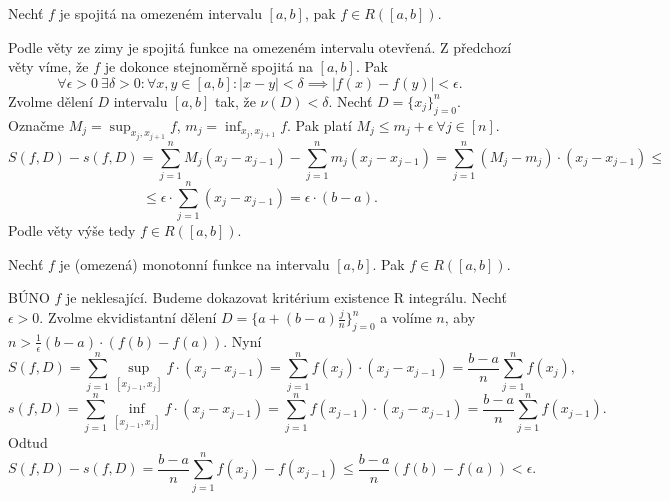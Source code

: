 \documentclass[12pt]{article}                   %
\begin{document}
        \begin{veta}
            Nechť $f$ je spojitá na omezeném intervalu $[a, b]$, pak $f \in R([a, b])$.

            \begin{dukazin}
                Podle věty ze zimy je spojitá funkce na omezeném intervalu otevřená. Z předchozí věty víme, že $f$ je dokonce stejnoměrně spojitá na $[a, b]$. Pak
                $$ \forall \epsilon > 0\ \exists \delta > 0: \forall x, y \in [a, b]: |x - y| < \delta \implies |f(x) - f(y)| < \epsilon. $$
                Zvolme dělení $D$ intervalu $[a, b]$ tak, že $\nu(D) < \delta$. Nechť $D = \{x_j\}_{j = 0}^n$. Označme $M_j = \sup_{x_j, x_{j + 1}}f$, $m_j = \inf_{x_j, x_{j + 1}}f$. Pak platí $M_j ≤ m_j + \epsilon\ \forall j \in [n]$.
                $$ S(f, D) - s(f, D) = \sum_{j=1}^n M_j(x_j - x_{j-1}) - \sum_{j=1}^n m_j(x_j - x_{j-1}) = \sum_{j=1}^n (M_j - m_j)·(x_j - x_{j-1}) ≤ $$
                $$ ≤ \epsilon·\sum_{j=1}^n (x_j - x_{j-1}) = \epsilon·(b - a). $$
                Podle věty výše tedy $f \in R([a, b])$.
            \end{dukazin}
        \end{veta}

        \begin{veta}
            Nechť $f$ je (omezená) monotonní funkce na intervalu $[a, b]$. Pak $f \in R([a, b])$.

            \begin{dukazin}
                BÚNO $f$ je neklesající. Budeme dokazovat kritérium existence R integrálu. Nechť $\epsilon > 0$. Zvolme ekvidistantní dělení $D = \{a + (b - a)\frac{j}{n}\}_{j=0}^n$ a volíme $n$, aby $n > \frac{1}{\epsilon}(b-a)·(f(b) - f(a))$. Nyní
                $$ S(f, D) = \sum_{j = 1}^n \sup_{[x_{j-1}, x_j]}f·(x_j - x_{j-1}) = \sum_{j=1}^n f(x_j)·(x_j - x_{j-1}) = \frac{b - a}{n} \sum_{j=1}^n f(x_j), $$ 
                $$ s(f, D) = \sum_{j = 1}^n \inf_{[x_{j-1}, x_j]}f·(x_j - x_{j-1}) = \sum_{j=1}^n f(x_{j-1})·(x_j - x_{j-1}) = \frac{b - a}{n} \sum_{j=1}^n f(x_{j-1}). $$ 
                Odtud
                $$ S(f, D) - s(f, D) = \frac{b-a}{n} \sum_{j=1}^n f(x_j) - f(x_{j-1}) ≤ \frac{b-a}{n}(f(b) - f(a)) < \epsilon. $$ 
            \end{dukazin}
        \end{veta}

\end{document}
